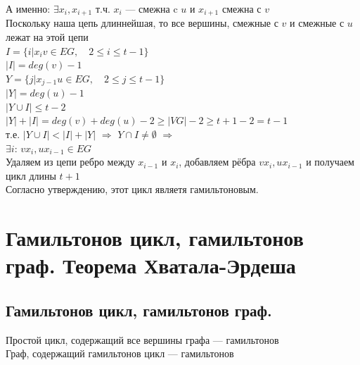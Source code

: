 \documentclass[12pt]{article}
\begin{document}
		А именно: $\exists x_i,x_{i+1}$ т.ч. $x_i$ — смежна c $u$ и $x_{i+1}$ смежна с $v$\\
		Поскольку наша цепь длиннейшая, то все вершины, смежные с $v$ и смежные с $u$ лежат на этой цепи\\
		$I = \{i | x_iv \in EG, \quad 2 \leqslant i \leqslant t-1\}$\\
		$|I| = deg(v) - 1$\\
		$Y = \{j | x_{j-1}u \in EG, \quad 2 \leqslant j \leqslant t-1\}$\\
		$|Y| = deg(u) - 1$\\
		$|Y \cup I| \leqslant t-2$\\
		$|Y| + |I| = deg(v) + deg(u) - 2 \geqslant |VG| - 2 \geqslant t + 1 - 2 = t-1$\\
		т.е. $|Y \cup I| < |I| + |Y|$ $\Rightarrow$ $Y \cap I \neq \emptyset$ $\Rightarrow$\\
		$\exists i$: $vx_i,ux_{i-1} \in EG$\\
		Удаляем из цепи ребро между $x_{i-1}$ и $x_{i}$, добавляем рёбра $vx_i,ux_{i-1}$ и получаем цикл длины $t+1$\\
		Согласно утверждению, этот цикл являетя гамильтоновым.\\
		\qedsymbol

\section{Гамильтонов цикл, гамильтонов граф. Теорема Хватала-Эрдеша}
\subsection{Гамильтонов цикл, гамильтонов граф.}
	Простой цикл, содержащий все вершины графа — гамильтонов\\
	Граф, содержащий гамильтонов цикл — гамильтонов
\end{document}
